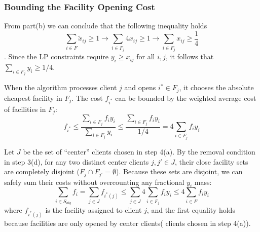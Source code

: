 \subsubsection*{Bounding the Facility Opening Cost}
From part(b) we can conclude that the following inequality holds
\[ \sum_{i \in F} \tilde{x}_{ij} \ge 1 \rightarrow \sum_{i \in F_j} 4x_{ij} \ge 1 \rightarrow  \sum_{i \in F_j} x_{ij} \ge \frac{1}{4}\]. 
Since the LP constraints require $y_i \ge x_{ij}$ for all $i, j$, it follows that $\sum_{i \in F_j} y_i \ge 1/4$.

When the algorithm processes client $j$ and opens $i^* \in F_j$, it chooses the absolute cheapest facility in $F_j$. The cost $f_{i^*}$ can be bounded by the weighted average cost of facilities in $F_j$:
\[ f_{i^*} \le \frac{\sum_{i \in F_j} f_i y_i}{\sum_{i \in F_j} y_i} \le \frac{\sum_{i \in F_j} f_i y_i}{1/4} = 4 \sum_{i \in F_j} f_i y_i \]

Let $J$ be the set of ``center'' clients chosen in step 4(a). By the removal condition in step 3(d), for any two distinct center clients $j, j' \in J$, their close facility sets are completely disjoint ($F_j \cap F_{j'} = \emptyset$). Because these sets are disjoint, we can safely sum their costs without overcounting any fractional $y_i$ mass:
\[ \sum_{i \in S_{alg}} f_{i} = \sum_{j \in J} f_{i^*(j)} \le \sum_{j \in J} 4 \sum_{i \in F_j} f_i y_i \le 4 \sum_{i \in F} f_i y_i \] 
where $f_{i^*(j)}$ is the facility assigned to client $j$, and the first equality holds because facilities are only opened by center clients( clients chosen in step 4(a)).

